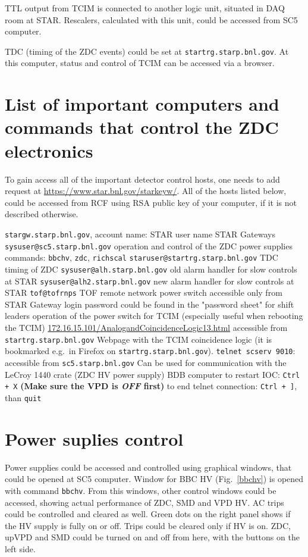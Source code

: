 TTL output from TCIM is connected to another logic unit, situated in DAQ room at STAR. Rescalers, calculated with this unit, could be accessed from SC5 computer.

TDC (timing of the ZDC events) could be set at \texttt{startrg.starp.bnl.gov}. At this computer, status and control of TCIM can be accessed via a browser.

\section{List of important computers and commands that control the ZDC electronics}

To gain access all of the important detector control hosts, one needs to add request at \url{https://www.star.bnl.gov/starkeyw/}. All of the hosts listed below, could be accessed from RCF using RSA public key of your computer, if it is not described otherwise.
\begin{outline}
 \1 \texttt{stargw.starp.bnl.gov}, account name: STAR user name
   \2 STAR Gateways
 \1 \texttt{sysuser@sc5.starp.bnl.gov} 
   \2 operation and control of the ZDC power supplies
   \2 commands: \texttt{bbchv}, \texttt{zdc}, \texttt{richscal}
 \1 \texttt{staruser@startrg.starp.bnl.gov}
   \2 TDC timing of ZDC
 \1 \texttt{sysuser@alh.starp.bnl.gov} 
   \2 old alarm handler for slow controls at STAR
 \1 \texttt{sysuser@alh2.starp.bnl.gov}
   \2 new alarm handler for slow controls at STAR
 \1 \texttt{tof@tofrnps}
   \2 TOF remote network power switch
   \2 accessible only from STAR Gateway
   \2 login password could be found in the "password sheet" for shift leaders
   \2 operation of the power switch for TCIM (especially useful when rebooting the TCIM)
 \1 \url{172.16.15.101/AnalogandCoincidenceLogic13.html}
   \2 accessible from \texttt{startrg.starp.bnl.gov}
   \2 Webpage with the TCIM coincidence logic (it is bookmarked e.g.\ in Firefox on \texttt{startrg.starp.bnl.gov}).
 \1 \texttt{telnet scserv 9010}: 
   \2 accessible  from \texttt{sc5.starp.bnl.gov}
   \2 Can be used for communication with the LeCroy 1440 crate (ZDC HV power supply)
   \2 BDB computer
   \2 to restart IOC: \texttt{Ctrl + X} \textbf{(Make sure the VPD is \textit{OFF} first)}
   \2 to end telnet connection: \texttt{Ctrl + ]}, than \texttt{quit}
\end{outline}


\section{Power suplies control}
Power supplies could be accessed and controlled using graphical windows, that could be opened at SC5 computer. 
Window for BBC HV (Fig.~\ref{bbchv}) is opened with command \texttt{bbchv}. From this windows, other control windows could be accessed, showing actual performance of ZDC, SMD and VPD HV. AC trips could be controlled and cleared as well. Green dots on the right panel shows if the HV supply is fully on or off. Trips could be cleared only if HV is on. ZDC, upVPD and SMD could be turned on and off from here, with the buttons on the left side.

